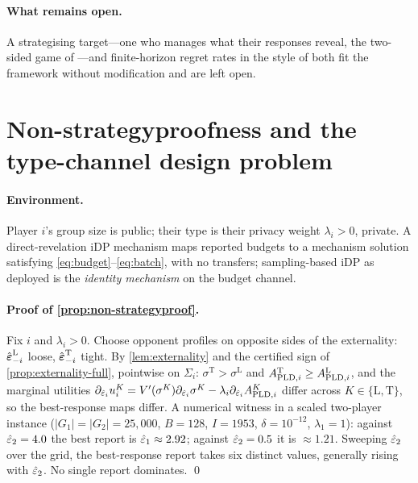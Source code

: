 \paragraph{What remains open.} A strategising target---one who
manages what their responses reveal, the two-sided game of
\citet{aumann1995repeated}---and finite-horizon regret rates in the
style of \citet{balcan2015commitment, blum2014learning} both fit the
framework without modification and are left open.

\section{Non-strategyproofness and the type-channel design problem}
\label{app:mechanism-design}

\paragraph{Environment.} Player $i$'s group size is public; their type
is their privacy weight $\lambda_i > 0$, private. A direct-revelation \ac{iDP}
mechanism maps reported budgets to a mechanism solution satisfying
\eqref{eq:budget}--\eqref{eq:batch}, with no transfers; sampling-based \ac{iDP} as deployed is the
\emph{identity mechanism} on the budget channel.

\paragraph{Proof of \cref{prop:non-strategyproof}.} Fix $i$ and $\lambda_i
> 0$. Choose opponent profiles on opposite sides of the externality:
$\hat{\boldsymbol{\varepsilon}}_{-i}^{\mathrm{L}}$ loose, $\hat{\boldsymbol{\varepsilon}}_{-i}^{\mathrm{T}}$
tight. By \cref{lem:externality} and the certified sign of
\cref{prop:externality-full},
pointwise on $\Sigma_i$: $\sigma^{\mathrm{T}} > \sigma^{\mathrm{L}}$ and $A_{\mathrm{PLD},i}^{\mathrm{T}} \geq
A_{\mathrm{PLD},i}^{\mathrm{L}}$, and the marginal utilities $\partial_{\hat{\varepsilon}_i} u_i^{K} =
V'(\sigma^{K})\partial_{\hat{\varepsilon}_i}\sigma^{K} - \lambda_i
\partial_{\hat{\varepsilon}_i} A_{\mathrm{PLD},i}^{K}$ differ across $K \in \{\mathrm{L}, \mathrm{T}\}$, so the
best-response maps differ. A numerical witness in a scaled two-player
instance ($|G_1|=|G_2|=25{,}000$, $B=128$, $I=1953$,
$\delta=10^{-12}$, $\lambda_1=1$):
against $\hat{\varepsilon}_2 = 4.0$ the best report is $\hat{\varepsilon}_1 \approx
2.92$; against $\hat{\varepsilon}_2 = 0.5$ it is $\approx 1.21$. Sweeping
$\hat{\varepsilon}_2$ over the grid, the best-response report takes six
distinct values, generally rising with $\hat{\varepsilon}_2$. No single report
dominates. \qed

